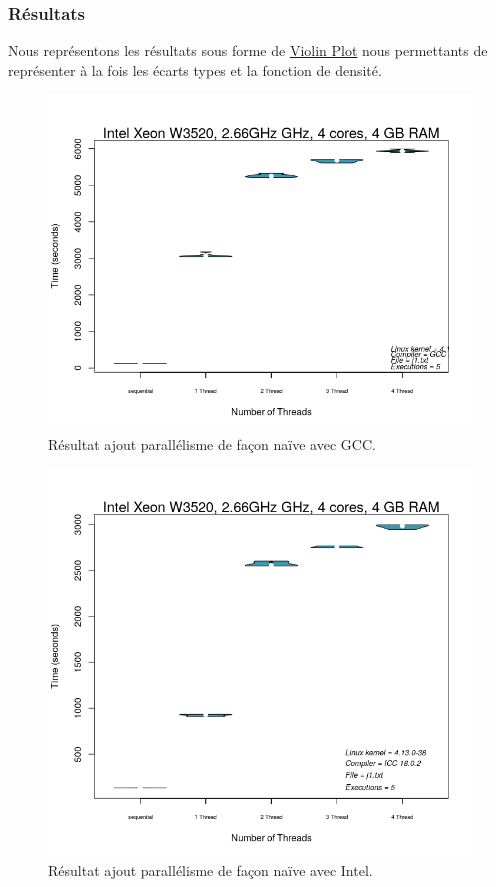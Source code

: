 \documentclass[
 aip,
 jmp,
 amsmath,amssymb,
 reprint
]{revtex4-1}
\begin{document}
\subsubsection{Résultats}

Nous représentons les résultats sous forme de \href{https://en.wikipedia.org/wiki/Violin_plot}{Violin Plot} nous permettants de représenter à la fois les écarts types et la fonction de densité.

\begin{figure}[H]
  \includegraphics[width=\linewidth, keepaspectratio=true]{gcc_parallel_naif.png}
  \caption{Résultat ajout parallélisme de façon naïve avec GCC.\label{Fig:gcc_naif}}
\end{figure}

\begin{figure}[H]
  \includegraphics[width=\linewidth, keepaspectratio=true]{intel_parallel_naif.png}
  \caption{Résultat ajout parallélisme de façon naïve avec Intel.\label{Fig:intel_naif}}
\end{figure}
\end{document}
